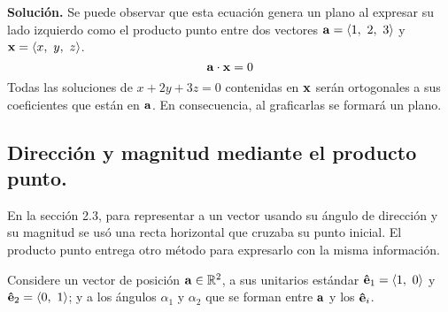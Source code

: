 \documentclass[12pt]{article}
\begin{document}
\textbf{Solución.} Se puede observar que esta ecuación genera un plano al expresar su lado izquierdo como el producto punto entre dos vectores $\mathbf{a} = \langle 1, \ 2, \ 3 \rangle$ y $\vecmat{x} = \langle x, \ y, \ z \rangle$.
\[
  \mathbf{a} \cdot \mathbf{x} = 0
\]
Todas las soluciones de $x + 2y + 3z = 0$ contenidas en $\mathbf{x}$ serán ortogonales a sus coeficientes que están en $\mathbf{a}$. En consecuencia, al graficarlas se formará un plano.

\subsection{Dirección y magnitud mediante el producto punto.}

En la sección 2.3, para representar a un vector usando su ángulo de dirección y su magnitud se usó una recta horizontal que cruzaba su punto inicial. El producto punto entrega otro método para expresarlo con la misma información.

Considere un vector de posición $\mathbf{a} \in \mathbb{R}^{2}$, a sus unitarios estándar $\mathbf{\hat{e}}_{1} = \langle 1, \ 0 \rangle$ y $\mathbf{\hat{e}}_{2} = \langle 0, \ 1 \rangle$; y a los ángulos $\alpha_{1}$ y $\alpha_{2}$ que se forman entre $\mathbf{a}$ y los $\mathbf{\hat{e}}_{i}$.

\begin{figure}[hbt!]
\centering


\end{figure}
\end{document}

